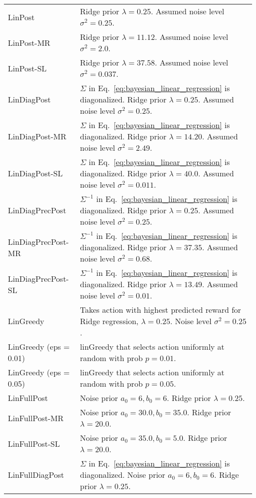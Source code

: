 \documentclass{article} \usepackage{iclr2018_conference,times}
\begin{document}
\begin{table}[ht]
\begin{adjustbox}{center}
\begin{tabular}{ll}
LinPost & Ridge prior $\lambda = 0.25$. Assumed noise level $\sigma^2 = 0.25$. \\
LinPost-MR & Ridge prior $\lambda = 11.12$. Assumed noise level $\sigma^2 = 2.0$. \\
LinPost-SL & Ridge prior $\lambda = 37.58$. Assumed noise level $\sigma^2 = 0.037$. \\
LinDiagPost & $\Sigma$ in Eq.~\ref{eq:bayesian_linear_regression} is diagonalized.  Ridge prior $\lambda = 0.25$. Assumed noise level $\sigma^2 = 0.25$. \\
LinDiagPost-MR & $\Sigma$ in Eq.~\ref{eq:bayesian_linear_regression} is diagonalized.  Ridge prior $\lambda = 14.20$. Assumed noise level $\sigma^2 = 2.49$. \\
LinDiagPost-SL & $\Sigma$ in Eq.~\ref{eq:bayesian_linear_regression} is diagonalized.  Ridge prior $\lambda = 40.0$. Assumed noise level $\sigma^2 = 0.011$. \\
LinDiagPrecPost & $\Sigma^{-1}$ in Eq.~\ref{eq:bayesian_linear_regression} is diagonalized.  Ridge prior $\lambda = 0.25$. Assumed noise level $\sigma^2 = 0.25$. \\
LinDiagPrecPost-MR & $\Sigma^{-1}$ in Eq.~\ref{eq:bayesian_linear_regression} is diagonalized.  Ridge prior $\lambda = 37.35$. Assumed noise level $\sigma^2 = 0.68$. \\
LinDiagPrecPost-SL & $\Sigma^{-1}$ in Eq.~\ref{eq:bayesian_linear_regression} is diagonalized.  Ridge prior $\lambda = 13.49$. Assumed noise level $\sigma^2 = 0.01$. \\
LinGreedy & Takes action with highest predicted reward for Ridge regression, $\lambda = 0.25$. Noise level $\sigma^2 = 0.25$. \\
LinGreedy (eps = 0.01) & linGreedy that selects action uniformly at random with prob $p=0.01$. \\
LinGreedy (eps = 0.05) & linGreedy that selects action uniformly at random with prob $p=0.05$. \\
LinFullPost & Noise prior $a_0 = 6, b_0 = 6$. Ridge prior $\lambda = 0.25$. \\
LinFullPost-MR & Noise prior $a_0 = 30.0, b_0 = 35.0$. Ridge prior $\lambda = 20.0$. \\
LinFullPost-SL & Noise prior $a_0 = 35.0, b_0 = 5.0$. Ridge prior $\lambda = 20.0$. \\
LinFullDiagPost & $\Sigma$ in Eq.~\ref{eq:bayesian_linear_regression} is diagonalized. Noise prior $a_0 = 6, b_0 = 6$. Ridge prior $\lambda = 0.25$. \\

\end{tabular}
\end{adjustbox}
\end{table}
\end{document}

